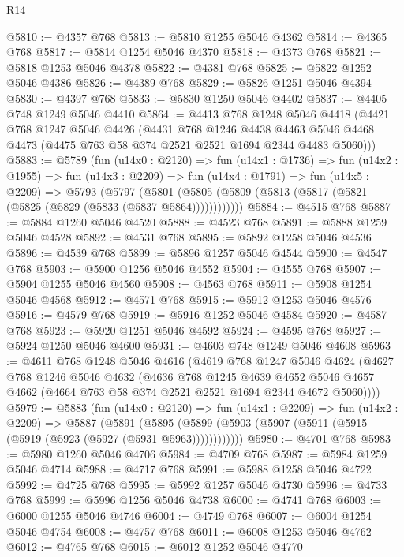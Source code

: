 \begin{lexlean}{R14}
\begin{coremodule}
@5810 := @4357 @768
@5813 := @5810 @1255 @5046 @4362
@5814 := @4365 @768
@5817 := @5814 @1254 @5046 @4370
@5818 := @4373 @768
@5821 := @5818 @1253 @5046 @4378
@5822 := @4381 @768
@5825 := @5822 @1252 @5046 @4386
@5826 := @4389 @768
@5829 := @5826 @1251 @5046 @4394
@5830 := @4397 @768
@5833 := @5830 @1250 @5046 @4402
@5837 := @4405 @748 @1249 @5046 @4410
@5864 := @4413
    @768
    @1248
    @5046
    @4418
    (@4421
      @768
      @1247
      @5046
      @4426
      (@4431
        @768
        @1246
        @4438
        @4463
        @5046
        @4468
        @4473
        (@4475 @763 @58 @374 @2521 @2521 @1694 @2344 @4483 @5060)))
@5883 := @5789
    (fun (u14x0 : @2120) =>
    fun (u14x1 : @1736) =>
    fun (u14x2 : @1955) =>
    fun (u14x3 : @2209) =>
    fun (u14x4 : @1791) =>
    fun (u14x5 : @2209) =>
    @5793
      (@5797 (@5801 (@5805 (@5809 (@5813 (@5817 (@5821 (@5825 (@5829 (@5833 (@5837 @5864))))))))))))
@5884 := @4515 @768
@5887 := @5884 @1260 @5046 @4520
@5888 := @4523 @768
@5891 := @5888 @1259 @5046 @4528
@5892 := @4531 @768
@5895 := @5892 @1258 @5046 @4536
@5896 := @4539 @768
@5899 := @5896 @1257 @5046 @4544
@5900 := @4547 @768
@5903 := @5900 @1256 @5046 @4552
@5904 := @4555 @768
@5907 := @5904 @1255 @5046 @4560
@5908 := @4563 @768
@5911 := @5908 @1254 @5046 @4568
@5912 := @4571 @768
@5915 := @5912 @1253 @5046 @4576
@5916 := @4579 @768
@5919 := @5916 @1252 @5046 @4584
@5920 := @4587 @768
@5923 := @5920 @1251 @5046 @4592
@5924 := @4595 @768
@5927 := @5924 @1250 @5046 @4600
@5931 := @4603 @748 @1249 @5046 @4608
@5963 := @4611
    @768
    @1248
    @5046
    @4616
    (@4619
      @768
      @1247
      @5046
      @4624
      (@4627
        @768
        @1246
        @5046
        @4632
        (@4636
          @768
          @1245
          @4639
          @4652
          @5046
          @4657
          @4662
          (@4664 @763 @58 @374 @2521 @2521 @1694 @2344 @4672 @5060))))
@5979 := @5883
    (fun (u14x0 : @2120) =>
    fun (u14x1 : @2209) =>
    fun (u14x2 : @2209) =>
    @5887
      (@5891 (@5895 (@5899 (@5903 (@5907 (@5911 (@5915 (@5919 (@5923 (@5927 (@5931 @5963))))))))))))
@5980 := @4701 @768
@5983 := @5980 @1260 @5046 @4706
@5984 := @4709 @768
@5987 := @5984 @1259 @5046 @4714
@5988 := @4717 @768
@5991 := @5988 @1258 @5046 @4722
@5992 := @4725 @768
@5995 := @5992 @1257 @5046 @4730
@5996 := @4733 @768
@5999 := @5996 @1256 @5046 @4738
@6000 := @4741 @768
@6003 := @6000 @1255 @5046 @4746
@6004 := @4749 @768
@6007 := @6004 @1254 @5046 @4754
@6008 := @4757 @768
@6011 := @6008 @1253 @5046 @4762
@6012 := @4765 @768
@6015 := @6012 @1252 @5046 @4770

\end{coremodule}
\end{lexlean}
